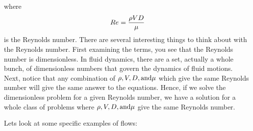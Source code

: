 \documentclass[12pt,twoside]{article}
\begin{document}
where
\begin{equation}
Re = {{\rho V D}\over\mu}
\end{equation}
is the Reynolds number.  There are several interesting things to think about
with the Reynolds number.   First examining the terms, you see that the
Reynolds number is dimensionless.   In fluid dynamics, there are a set,
actually a whole bunch, of dimensionless numbers that govern the dynamics of
fluid motions.   Next, notice that any combination of $\rho, V, D, {\rm and}
\mu$ which give the same Reynolds number will give the same answer to the
equations.   Hence, if we solve the dimensionless problem for a given Reynolds
number, we have a solution for a whole class of problems where $\rho, V, D, {\rm
and} \mu$ give the same Reynolds number.

Lets look at some specific examples of flows:
\end{document}
